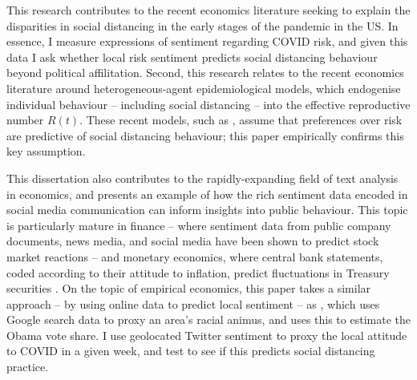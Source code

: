 \documentclass[12pt,a4]{article}
\begin{document}

This research contributes to the recent economics literature seeking to explain the disparities in social distancing in the early stages of the pandemic in the US.  In essence, I measure expressions of sentiment regarding COVID risk, and given this data I ask whether local risk sentiment predicts social distancing behaviour beyond political affilitation. Second, this research relates to the recent economics literature around heterogeneous-agent epidemiological models, which endogenise individual behaviour -- including social distancing -- into the effective reproductive number \(R(t)\). These recent models, such as \textcite{acemogluTestingVoluntarySocial2020,brotherhoodEconomicModelCOVID192020,eichenbaumMacroeconomicsEpidemics2020}, assume that preferences over risk are predictive of social distancing behaviour; this paper empirically confirms this key assumption.

This dissertation also contributes to the rapidly-expanding field of text analysis in economics, and presents an example of how the rich sentiment data encoded in social media communication can inform insights into public behaviour. This topic is particularly mature in finance -- where sentiment data from public company documents, news media, and social media have been shown to predict stock market reactions \parencite{bollenTwitterMoodPredicts2011} -- and monetary economics, where central bank statements, coded according to their attitude to inflation, predict fluctuations in Treasury securities \parencite{luccaMeasuringCentralBank2009,gentzkowTextData2019}. On the topic of empirical economics, this paper takes a similar approach -- by using online data to predict local sentiment -- as \textcite{stephens-davidowitzCostRacialAnimus2014}, which uses Google search data to proxy an area's racial animus, and uses this to estimate the Obama vote share. I use geolocated Twitter sentiment to proxy the local attitude to COVID in a given week, and test to see if this predicts social distancing practice. 
\end{document}
